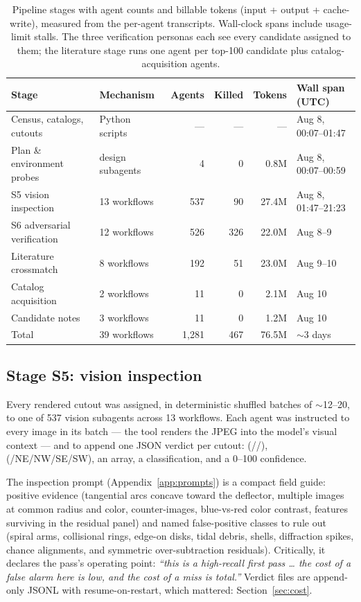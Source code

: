 \documentclass[11pt,letterpaper]{article}
\begin{document}
\begin{table}[ht]
\centering
\caption{Pipeline stages with agent counts and billable tokens (input +
output + cache-write), measured from the per-agent transcripts. Wall-clock
spans include usage-limit stalls. The three verification personas each see
every candidate assigned to them; the literature stage runs one agent per
top-100 candidate plus catalog-acquisition agents.}
\label{tab:stages}
\small
\begin{tabular}{@{}llrrrl@{}}
\toprule
Stage & Mechanism & Agents & Killed & Tokens & Wall span (UTC) \\
\midrule
Census, catalogs, cutouts & Python scripts & --- & --- & --- & Aug 8, 00:07--01:47 \\
Plan \& environment probes & design subagents & 4 & 0 & 0.8M & Aug 8, 00:07--00:59 \\
S5 vision inspection & 13 workflows & 537 & 90 & 27.4M & Aug 8, 01:47--21:23 \\
S6 adversarial verification & 12 workflows & 526 & 326 & 22.0M & Aug 8--9 \\
Literature crossmatch & 8 workflows & 192 & 51 & 23.0M & Aug 9--10 \\
Catalog acquisition & 2 workflows & 11 & 0 & 2.1M & Aug 10 \\
Candidate notes & 3 workflows & 11 & 0 & 1.2M & Aug 10 \\
\midrule
Total & 39 workflows & 1{,}281 & 467 & 76.5M & $\sim$3 days \\
\bottomrule
\end{tabular}
\end{table}

\subsection{Stage S5: vision inspection}\label{sec:inspection}

Every rendered cutout was assigned, in deterministic shuffled batches of
$\sim$12--20, to one of 537 vision subagents across 13 workflows. Each agent
was instructed to  every image in its batch --- the tool renders
the JPEG into the model's visual context --- and to append one JSON verdict
per cutout:  (//),
 (/NE/NW/SE/SW), an  array,
a  classification, and a 0--100 confidence.

The inspection prompt (Appendix~\ref{app:prompts}) is a compact field guide:
positive evidence (tangential arcs concave toward the deflector, multiple
images at common radius and color, counter-images, blue-vs-red color
contrast, features surviving in the residual panel) and named false-positive
classes to rule out (spiral arms, collisional rings, edge-on disks, tidal
debris, shells, diffraction spikes, chance alignments, and symmetric
over-subtraction residuals). Critically, it declares the pass's operating
point: \emph{``this is a high-recall first pass \ldots{} the cost of a false
alarm here is low, and the cost of a miss is total.''} Verdict files are
append-only JSONL with resume-on-restart, which mattered:
Section~\ref{sec:cost}.
\end{document}
